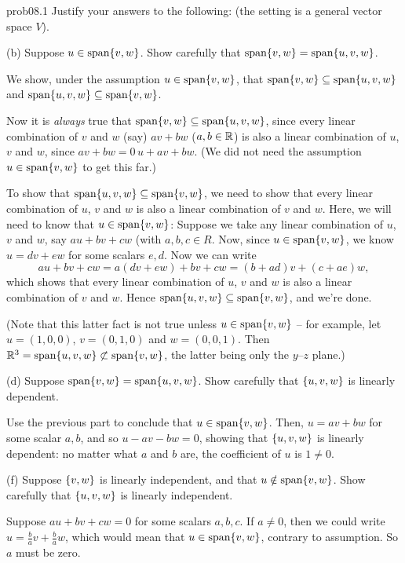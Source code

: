 \begin{sol}{prob08.1} Justify your answers to the following: (the setting is a general vector space $V$).\medskip

(b)  Suppose $u \in \textrm{span}\{v,w\}$. Show carefully that $\textrm{span}\{v,w\}=\textrm{span}\{u,v,w\}$.

\soln We show, under the assumption $u \in \textrm{span}\{v,w\}$, that  $\textrm{span}\{v,w\}\subseteq\textrm{span}\{u,v,w\}$ and $\textrm{span}\{u, v,w\}\subseteq\textrm{span}\{v,w\}$. 

Now it is {\it always} true that $\textrm{span}\{v,w\}\subseteq\textrm{span}\{u,v,w\}$, since every linear combination of $v$ and $w$ (say) $a v +b w$ ($a,b\in \mathbb{R}$) is also a linear combination of $u$, $v$ and $w$, since $a v +b w = 0\, u +a v + b w$. (We did not need the assumption $u \in \textrm{span}\{v,w\}$ to get this far.)

To show that $\textrm{span}\{u, v,w\}\subseteq\textrm{span}\{v,w\}$, we need to show that  every linear combination of $u$, $v$ and $w$ is also a linear combination of $v$ and $w$. Here, we will need to know that $u \in \textrm{span}\{v,w\}$: Suppose we take any linear combination of $u$, $v$ and $w$, say $au +bv +c w$ (with $a,b,c \in R$. Now, since $u \in \textrm{span}\{v,w\}$, we know $u= d v + e w$ for some scalars $e, d$. Now we can write $$au +bv +c w= a(d v + e w) + bv + cw=(b+ad)v +(c+ae) w,$$which shows that  every linear combination of $u$, $v$ and $w$ is also a linear combination of $v$ and $w$. Hence $\textrm{span}\{u,v,w\} \subseteq \textrm{span}\{v,w\}$, and we're done.

(Note that this latter fact is not true unless $u \in \textrm{span}\{v,w\}$ -- for example, let $u=(1,0,0)$, $v=(0,1,0)$ and $w=(0,0,1)$. Then $\mathbb{R}^3=\textrm{span}\{u,v,w\}\not\subset \textrm{span}\{v,w\}$, the latter being only the $y$--$z$ plane.)
\medskip
%

(d)  Suppose $\textrm{span}\{v,w\}=\textrm{span}\{u,v,w\}$. Show carefully that $\{u,v,w \}$ is linearly dependent. 

\soln Use the previous part to conclude that $u \in \textrm{span}\{v,w\}$. Then, $u= a v + b w$ for some scalar $a, b$, and so $u-av -bw=0$, showing that $\{u,v,w \}$ is linearly dependent: no matter what $a$ and $b$ are, the coefficient of $u$ is $1\not=0$.
\medskip
%

(f)  Suppose $\{v,w \}$ is linearly independent, and that $u \notin \textrm{span}\{v,w\}$. Show carefully that $\{u,v,w \}$ is linearly independent.

\soln Suppose $a u + bv+ cw=0$ for some scalars $a,b,c$. If $a\not=0$, then we could write $u= \frac{b}{a} v+ \frac{b}{a} w$, which would mean that $u \in \textrm{span}\{v,w\}$, contrary to assumption. So $a$ must be zero. 


\end{sol}
